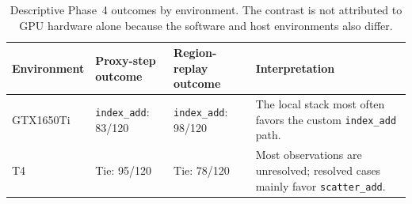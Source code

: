 \begin{table}[tbp]
\centering\small
\caption{Descriptive Phase~4 outcomes by environment. The contrast is not attributed to GPU hardware alone because the software and host environments also differ.}
\label{tab:phase4-environment-comparison}
\setlength{\tabcolsep}{3pt}
\begin{tabularx}{\linewidth}{lXXX}
\toprule
Environment & Proxy-step outcome & Region-replay outcome & Interpretation \\
\midrule
GTX1650Ti & \texttt{index\_add}: 83/120 & \texttt{index\_add}: 98/120 & The local stack most often favors the custom \texttt{index\_add} path. \\
T4 & Tie: 95/120 & Tie: 78/120 & Most observations are unresolved; resolved cases mainly favor \texttt{scatter\_add}. \\
\bottomrule
\end{tabularx}
\end{table}